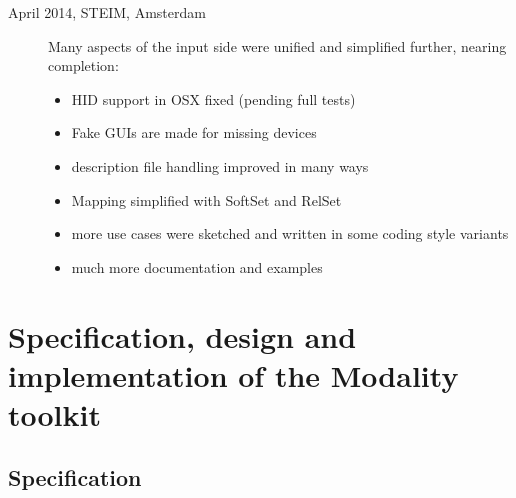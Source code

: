\documentclass{article}
\begin{document}
\begin{description}
		
		
	\item[April 2014, STEIM, Amsterdam] 	Many aspects of the input side were unified and simplified further, nearing completion:
	\begin{itemize} 
		\item HID support in OSX fixed (pending full tests)
		\item Fake GUIs are made for missing devices
		\item description file handling improved in many ways
		\item Mapping simplified with SoftSet and RelSet
		\item more use cases were sketched and written in some coding style variants
		\item much more documentation and examples
	\end{itemize}
\end{description}






\section{Specification, design and implementation of the Modality toolkit}
\label{sec:implementation}


\subsection{Specification}
\label{sub:specification}
\end{document}
